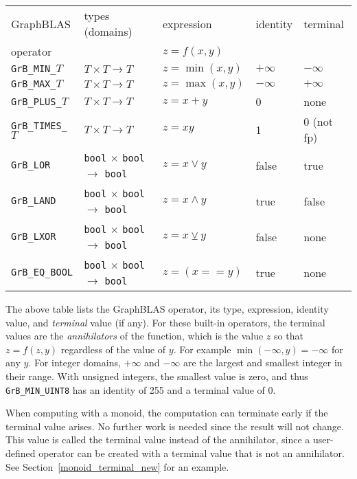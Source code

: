 \documentclass[12pt]{article}
\begin{document}

\vspace{0.2in}
{\footnotesize
\begin{tabular}{lllll}
\hline
GraphBLAS             & types (domains)            & expression      & identity  & terminal \\
operator              &                            & $z=f(x,y)$      &           & \\
\hline
\verb'GrB_MIN_'$T$    & $T \times T \rightarrow T$ & $z = \min(x,y)$ & $+\infty$ & $-\infty$ \\
\verb'GrB_MAX_'$T$    & $T \times T \rightarrow T$ & $z = \max(x,y)$ & $-\infty$ & $+\infty$ \\
\verb'GrB_PLUS_'$T$   & $T \times T \rightarrow T$ & $z = x+y$       & 0         & none \\
\verb'GrB_TIMES_'$T$  & $T \times T \rightarrow T$ & $z = xy$        & 1         & 0 (not fp) \\
\hline
\verb'GrB_LOR'        & \verb'bool' $\times$ \verb'bool' $\rightarrow$ \verb'bool' & $z = x \vee    y $ & false & true  \\
\verb'GrB_LAND'       & \verb'bool' $\times$ \verb'bool' $\rightarrow$ \verb'bool' & $z = x \wedge  y $ & true  & false \\
\verb'GrB_LXOR'       & \verb'bool' $\times$ \verb'bool' $\rightarrow$ \verb'bool' & $z = x \veebar y $ & false & none \\
\verb'GrB_EQ_BOOL'    & \verb'bool' $\times$ \verb'bool' $\rightarrow$ \verb'bool' & $z =(x ==      y)$ & true  & none \\
\hline
\end{tabular}
}
\vspace{0.2in}

The above table lists the GraphBLAS operator, its type, expression, identity
value, and {\em terminal} value (if any).  For these built-in operators, the
terminal values are the {\em annihilators} of the function, which is the value
$z$ so that $z=f(z,y)$ regardless of the value of $y$.  For example
$\min(-\infty,y) = -\infty$ for any $y$.  For integer domains, $+\infty$ and
$-\infty$ are the largest and smallest integer in their range.  With unsigned
integers, the smallest value is zero, and thus \verb'GrB_MIN_UINT8' has an
identity of 255 and a terminal value of 0.

When computing with a monoid, the computation can terminate early if the
terminal value arises.  No further work is needed since the result will not
change.  This value is called the terminal value instead of the annihilator,
since a user-defined operator can be created with a terminal value that is not
an annihilator.  See Section~\ref{monoid_terminal_new} for an example.
\end{document}
